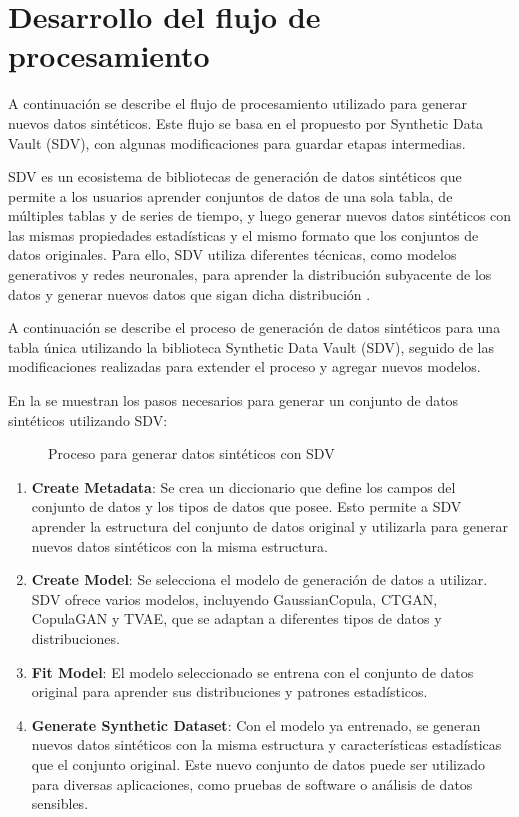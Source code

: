 \section{Desarrollo del flujo de procesamiento}
A continuación se describe el flujo de procesamiento utilizado para generar nuevos datos sintéticos. Este flujo se basa en el propuesto por Synthetic Data Vault (SDV), con algunas modificaciones para guardar etapas intermedias.

SDV es un ecosistema de bibliotecas de generación de datos sintéticos que permite a los usuarios aprender conjuntos de datos de una sola tabla, de múltiples tablas y de series de tiempo, y luego generar nuevos datos sintéticos con las mismas propiedades estadísticas y el mismo formato que los conjuntos de datos originales. Para ello, SDV utiliza diferentes técnicas, como modelos generativos y redes neuronales, para aprender la distribución subyacente de los datos y generar nuevos datos que sigan dicha distribución \cite{kotelnikov_overview_nodate, patki_synthetic_2016}.

A continuación se describe el proceso de generación de datos sintéticos para una tabla única utilizando la biblioteca Synthetic Data Vault (SDV), seguido de las modificaciones realizadas para extender el proceso y agregar nuevos modelos.


\newpage
En la  se muestran los pasos necesarios para generar un conjunto de datos sintéticos utilizando SDV:

\begin{figure}[H]
	\centering
	
	\caption{Proceso para generar datos sintéticos con SDV}
	\label{process-sdv}
\end{figure}

\begin{enumerate}
    \item \textbf{Create Metadata}: Se crea un diccionario que define los campos del conjunto de datos y los tipos de datos que posee. Esto permite a SDV aprender la estructura del conjunto de datos original y utilizarla para generar nuevos datos sintéticos con la misma estructura.
    \item \textbf{Create Model}: Se selecciona el modelo de generación de datos a utilizar. SDV ofrece varios modelos, incluyendo GaussianCopula, CTGAN, CopulaGAN y TVAE, que se adaptan a diferentes tipos de datos y distribuciones.
    \item \textbf{Fit Model}: El modelo seleccionado se entrena con el conjunto de datos original para aprender sus distribuciones y patrones estadísticos.
    \item \textbf{Generate Synthetic Dataset}: Con el modelo ya entrenado, se generan nuevos datos sintéticos con la misma estructura y características estadísticas que el conjunto original. Este nuevo conjunto de datos puede ser utilizado para diversas aplicaciones, como pruebas de software o análisis de datos sensibles.
\end{enumerate}

